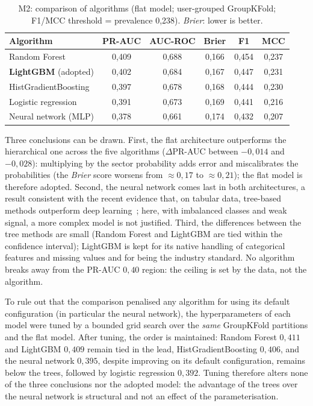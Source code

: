 \begin{table}[htbp]
\centering
\caption{M2: comparison of algorithms (flat model; user-grouped GroupKFold; F1/MCC threshold = prevalence 0,238). \textit{Brier}: lower is better.}
\label{tab:m2_algos}
\begin{tabular}{lccccc}
\toprule
\textbf{Algorithm} & \textbf{PR-AUC} & \textbf{AUC-ROC} & \textbf{Brier} & \textbf{F1} & \textbf{MCC} \\
\midrule
Random Forest                  & 0,409 & 0,688 & 0,166 & 0,454 & 0,237 \\
\textbf{LightGBM} (adopted)    & 0,402 & 0,684 & 0,167 & 0,447 & 0,231 \\
HistGradientBoosting           & 0,397 & 0,678 & 0,168 & 0,444 & 0,230 \\
Logistic regression            & 0,391 & 0,673 & 0,169 & 0,441 & 0,216 \\
Neural network (MLP)           & 0,378 & 0,661 & 0,174 & 0,432 & 0,207 \\
\bottomrule
\end{tabular}
\end{table}

Three conclusions can be drawn. First, the flat architecture outperforms the hierarchical one across the five algorithms ($\Delta$PR-AUC between $-0{,}014$ and $-0{,}028$): multiplying by the sector probability adds error and miscalibrates the probabilities (the \textit{Brier} score worsens from $\approx0{,}17$ to $\approx0{,}21$); the flat model is therefore adopted. Second, the neural network comes last in both architectures, a result consistent with the recent evidence that, on tabular data, tree-based methods outperform deep learning~\cite{grinsztajn2022}; here, with imbalanced classes and weak signal, a more complex model is not justified. Third, the differences between the tree methods are small (Random Forest and LightGBM are tied within the confidence interval); LightGBM is kept for its native handling of categorical features and missing values and for being the industry standard. No algorithm breaks away from the PR-AUC $0{,}40$ region: the ceiling is set by the data, not the algorithm.

To rule out that the comparison penalised any algorithm for using its default configuration (in particular the neural network), the hyperparameters of each model were tuned by a bounded grid search over the \emph{same} GroupKFold partitions and the flat model. After tuning, the order is maintained: Random Forest $0{,}411$ and LightGBM $0{,}409$ remain tied in the lead, HistGradientBoosting $0{,}406$, and the neural network $0{,}395$, despite improving on its default configuration, remains below the trees, followed by logistic regression $0{,}392$. Tuning therefore alters none of the three conclusions nor the adopted model: the advantage of the trees over the neural network is structural and not an effect of the parameterisation.

